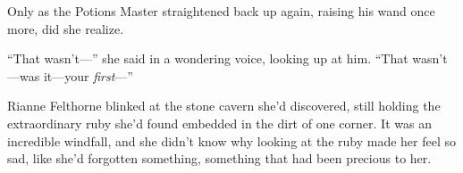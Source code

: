 Only as the Potions Master straightened back up again, raising his wand once more, did she realize.

“That wasn’t—” she said in a wondering voice, looking up at him. “That wasn’t—was it—your \emph{first}—”

Rianne Felthorne blinked at the stone cavern she’d discovered, still holding the extraordinary ruby she’d found embedded in the dirt of one corner. It was an incredible windfall, and she didn’t know why looking at the ruby made her feel so sad, like she’d forgotten something, something that had been precious to her.



